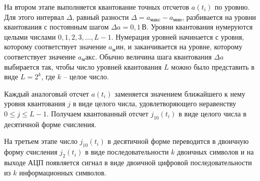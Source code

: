 \documentclass[a4paper, 12pt]{article}
\begin{document}
На втором этапе выполняется квантование точных отсчетов 
$a(t_i)$ по уровню. Для этого интервал $\Delta$, равный 
разности $\Delta=a_{макс} - a_{мин}$, разбивается на уровни 
квантования с постоянным шагом $\Delta a =0,1\, В$. 
Уровни квантования нумеруются целыми числами 
$0,1,2,3,...,L-1$. Нумерация уровней начинается с уровня, 
которому соответствует значение $a_мин$, и заканчивается на 
уровне, которому соответствует значение $a_макс$. Обычно
величина шага квантования $\Delta a$ выбирается так, чтобы 
число уровней квантования $L$ можно было представить в виде 
$L=2^k$, где $k$ -- целое число. 

Каждый аналоговый отсчет $a(t_i)$ заменяется значением 
ближайшего к нему уровня квантования $j$ в виде целого числа, 
удовлетворяющего неравенству $0\leq j \leq L-1$. 
Получаем квантованный отсчет $j_{10}(t_i)$ в виде целого 
числа в десятичной форме счисления.

На третьем этапе число $j_{10}(t_i)$ в десятичной форме 
переводится в двоичную форму счисления $j_2(t_i)$ в виде 
последовательности $k$ двоичных
символов и на выходе АЦП появляется сигнал в виде двоичной цифровой последовательности из $k$ информационных символов.
\end{document}
